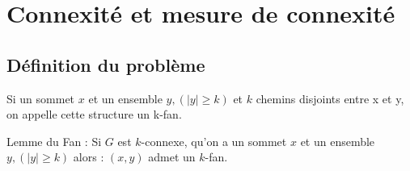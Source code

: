 \documentclass{article}      %
\begin{document}
\section{Connexité et mesure de connexité}
\subsection{Définition du problème}

Si un sommet $x$ et un ensemble $y, (|y| \geq k)$ et $k$ chemins disjoints entre x et y, on appelle cette structure un k-fan.

Lemme du Fan :
Si $G$ est $k$-connexe, qu’on a un sommet $x$ et un ensemble $y, (|y| \geq k)$ alors : $(x, y)$ admet un $k$-fan.
\end{document}
